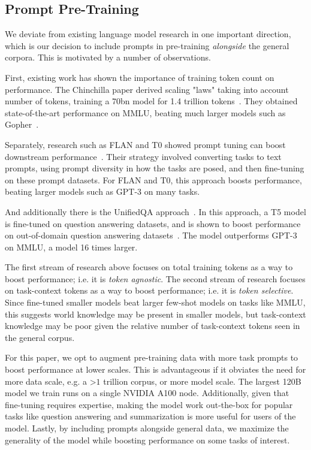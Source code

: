 \subsection{Prompt Pre-Training}

We deviate from existing language model research in one important direction, which is our decision to include prompts in pre-training \textit{alongside} the general corpora. This is motivated by a number of observations.

First, existing work has shown the importance of training token count on performance. The Chinchilla paper derived scaling "laws" taking into account number of tokens, training a 70bn model for 1.4 trillion tokens~\citep{Chinchilla}. They obtained state-of-the-art performance on MMLU, beating much larger models such as Gopher~\citep{Gopher}. 

Separately, research such as FLAN and T0 showed prompt tuning can boost downstream performance~\citep{FLAN, T0, FLANPALM}. Their strategy involved converting tasks to text prompts, using prompt diversity in how the tasks are posed, and then fine-tuning on these prompt datasets. For FLAN and T0, this approach boosts performance, beating larger models such as GPT-3 on many tasks.

And additionally there is the UnifiedQA approach~\citep{UnifiedQA}. In this approach, a T5 model is fine-tuned on question answering datasets, and is shown to boost performance on out-of-domain question answering datasets~\citep{2020t5}. The model outperforms GPT-3 on MMLU, a model 16 times larger.

The first stream of research above focuses on total training tokens as a way to boost performance; i.e. it is \textit{token agnostic}. The second stream of research focuses on task-context tokens as a way to boost performance; i.e. it is \textit{token selective}. Since fine-tuned smaller models beat larger few-shot models on tasks like MMLU, this suggests world knowledge may be present in smaller models, but task-context knowledge may be poor given the relative number of task-context tokens seen in the general corpus. 

For this paper, we opt to augment pre-training data with more task prompts to boost performance at lower scales. This is advantageous if it obviates the need for more data scale, e.g. a  >\(1\) trillion corpus, or more model scale.  The largest 120B model we train runs on a single NVIDIA A100 node. Additionally, given that fine-tuning requires expertise, making the model work out-the-box for popular tasks like question answering and summarization is more useful for users of the model. Lastly, by including prompts alongside general data, we maximize the generality of the model while boosting performance on some tasks of interest.


